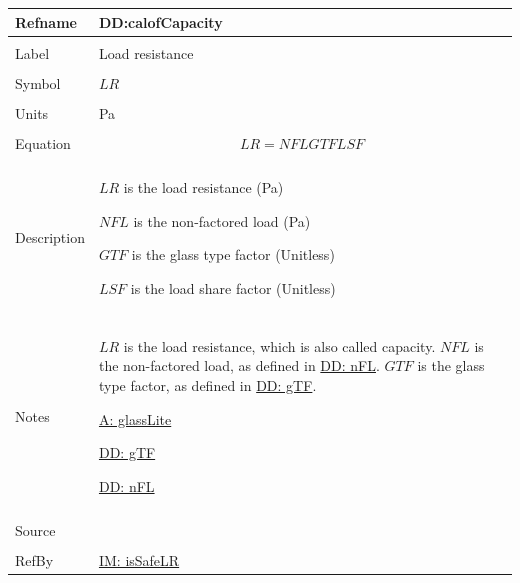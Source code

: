 \documentclass[12pt]{article}
\begin{document}
\noindent \begin{minipage}{\textwidth}
\begin{tabular}{>{\raggedright}p{}>{\raggedright\arraybackslash}p{}}
\toprule \textbf{Refname} & \textbf{DD:calofCapacity}
\label{DD:calofCapacity}
\\ \midrule \\
Label & Load resistance
        
\\ \midrule \\
Symbol & $LR$
         
\\ \midrule \\
Units & Pa
        
\\ \midrule \\
Equation & \begin{displaymath}
           LR=NFL GTF LSF
           \end{displaymath}
\\ \midrule \\
Description & \begin{symbDescription}
              \item{$LR$ is the load resistance (Pa)}
              \item{$NFL$ is the non-factored load (Pa)}
              \item{$GTF$ is the glass type factor (Unitless)}
              \item{$LSF$ is the load share factor (Unitless)}
              \end{symbDescription}
\\ \midrule \\
Notes & $LR$ is the load resistance, which is also called capacity. $NFL$ is the non-factored load, as defined in \hyperref[DD:nFL]{DD: nFL}. $GTF$ is the glass type factor, as defined in \hyperref[DD:gTF]{DD: gTF}.
        
        \hyperref[assumpGL]{A: glassLite}
        
        \hyperref[DD:gTF]{DD: gTF}
        
        \hyperref[DD:nFL]{DD: nFL}
        
\\ \midrule \\
Source & \cite{astm2009}
         
\\ \midrule \\
RefBy & \hyperref[IM:isSafeLR]{IM: isSafeLR}
        
\\ \bottomrule
\end{tabular}
\end{minipage}
\end{document}
